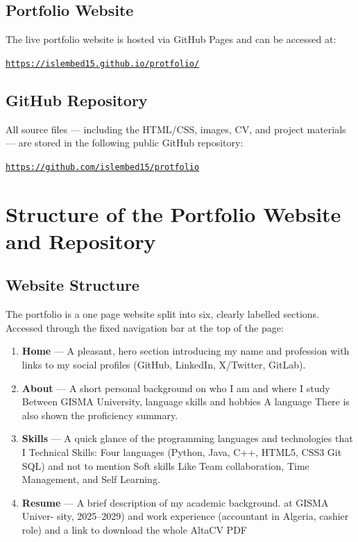 \documentclass[12pt,a4paper]{article}
\begin{document}
\subsection{Portfolio Website}
The live portfolio website is hosted via GitHub Pages and can be accessed at:

\begin{center}
\href{https://islembed15.github.io/protfolio/}{\texttt{https://islembed15.github.io/protfolio/}}
\end{center}

\subsection{GitHub Repository}
All source files --- including the HTML/CSS, images, CV, and project materials ---
are stored in the following public GitHub repository:

\begin{center}
\href{https://github.com/islembed15/protfolio}{\texttt{https://github.com/islembed15/protfolio}}
\end{center}

\section{Structure of the Portfolio Website and Repository}

\subsection{Website Structure}
The portfolio is a one page website split into six, clearly labelled sections.
Accessed through the fixed navigation bar at the top of the page:

\begin{enumerate}[leftmargin=2cm]
    \item \textbf{Home} --- A pleasant, hero section introducing my name and profession with links
    to my social profiles (GitHub, LinkedIn, X/Twitter, GitLab).
    \item \textbf{About} --- A short personal background on who I am and where I study
    Between GISMA University, language skills and hobbies A language
    There is also shown the proficiency summary.
    \item \textbf{Skills} --- A quick glance of the programming languages and technologies that I
    Technical Skills: Four languages (Python, Java, C++, HTML5, CSS3 Git SQL) and not to mention Soft
    skills
    Like Team collaboration, Time Management, and Self Learning.
    \item \textbf{Resume} --- A brief description of my academic background. at GISMA Univer-
    sity, 2025–2029) and work experience (accountant in Algeria, cashier
    role) and a link to download the whole AltaCV PDF
\end{enumerate}
\end{document}
